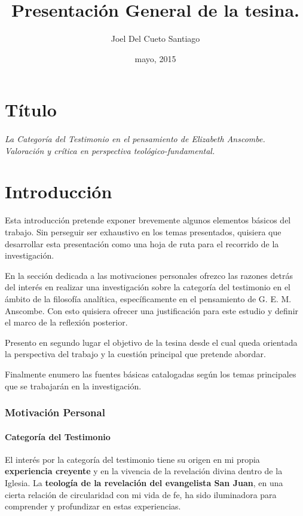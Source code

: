 \documentclass[12pt]{article}
\title{Presentación General de la tesina.}
\author{Joel Del Cueto Santiago}
\date{mayo, 2015}
\begin{document}

\maketitle

\part*{Título}
\paragraph{\noindent La Categoría del Testimonio en el pensamiento de Elizabeth Anscombe.\\
\emph{Valoración y crítica en perspectiva teológico-fundamental.}}

\part*{Introducción}

Esta introducción pretende exponer brevemente algunos elementos básicos del trabajo. Sin perseguir ser exhaustivo en los temas presentados, quisiera que desarrollar esta presentación como una hoja de ruta para el recorrido de la investigación. 

En la sección dedicada a las motivaciones personales ofrezco las razones detrás del interés en realizar una investigación sobre la categoría del testimonio en el ámbito de la filosofía analítica, específicamente en el pensamiento de G. E. M. Anscombe. Con esto quisiera ofrecer una justificación para este estudio y definir el marco de la reflexión posterior.

Presento en segundo lugar el objetivo de la tesina desde el cual queda orientada la perspectiva del trabajo y la cuestión principal que pretende abordar.

Finalmente enumero las fuentes básicas catalogadas según los temas principales que se trabajarán en la investigación.

\section{Motivación Personal}

\subsection{Categoría del Testimonio}

El interés por la categoría del testimonio tiene su origen en mi propia \textbf{experiencia creyente} y en la vivencia de la revelación divina dentro de la Iglesia. La \textbf{teología de la revelación del evangelista San Juan}, en una cierta relación de circularidad con mi vida de fe, ha sido iluminadora para comprender y profundizar en estas experiencias.
\end{document}
